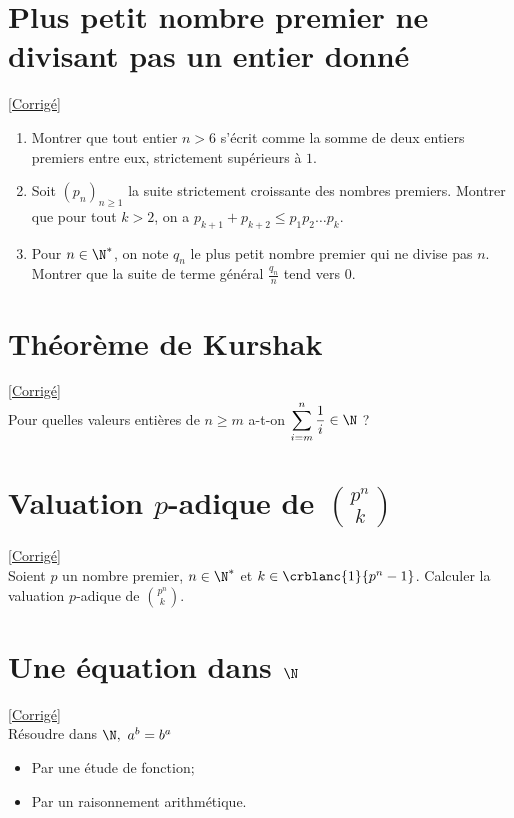 \documentclass[8pt]{book}
\begin{document}
\section{Plus petit nombre premier ne divisant pas un entier donné}
\label{Plus petit nombre premier ne divisant pas un entier donné}
\textcolor{blue}{\hyperref[Plus petit nombre premier ne divisant pas un entier donné corrigé]{[Corrigé]}}\\
\begin{enumerate}[leftmargin=*]
	\item Montrer que tout entier $n>6$ s'écrit comme la somme de deux entiers premiers entre eux, strictement supérieurs à $1$.
	\item Soit $(p_n)_{n\geq 1}$ la suite strictement croissante des nombres premiers. Montrer que pour tout $k>2$, on a $p_{k+1}+p_{k+2}\leq p_1p_2\dots p_k$.
	\item Pour $n\in \N^*$, on note $q_n$ le plus petit nombre premier qui ne divise pas $n$. Montrer que la suite de terme général $\displaystyle\frac{q_n}{n}$ tend vers $0$.
\end{enumerate}

\section{Théorème de Kurshak }
\label{Théorème de Kurshak}
\textcolor{blue}{\hyperref[Théorème de Kurshak corrigé]{[Corrigé]}}\\
Pour quelles valeurs entières de $n\geq m$ a-t-on $\displaystyle\sum\limits_{i=m}^{n}{\frac{1}{i}}\in \N$ ?

\section{Valuation $p$-adique de $\displaystyle\binom{p^n}{k}$ }
\label{Valuation padique de binom(p^n)(k)}
\textcolor{blue}{\hyperref[Valuation padique de binom(p^n)(k) corrigé]{[Corrigé]}}\\
Soient $p$ un nombre premier, $n\in \N^*$ et $k\in \crblanc{1}{p^n-1}$. Calculer la valuation $p$-adique de $\displaystyle\binom{p^n}{k}$.

\section{Une équation dans $\N$ }
\label{Une équation dans N}
\textcolor{blue}{\hyperref[Une équation dans N corrigé]{[Corrigé]}}\\
Résoudre dans $\N,\ a^b=b^a$
\begin{itemize}
	\item Par une étude de fonction;
	\item Par un raisonnement arithmétique.
\end{itemize}
\end{document}
